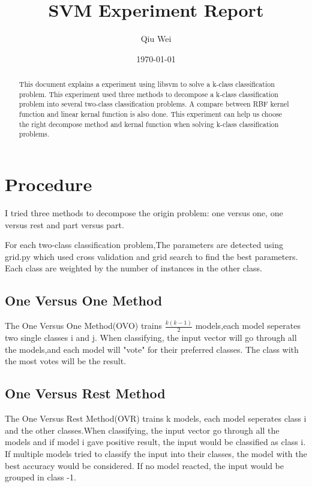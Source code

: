 \documentclass[11pt]{article}
\author{Qiu Wei}
\date{\today}
\title{SVM Experiment Report}
\begin{document}
\maketitle
\tableofcontents

\begin{abstract}
This document explains a experiment using libsvm to solve a
k-class classification problem. This experiment used three methods
to decompose a k-class classification problem into several two-class
classification problems. A compare between RBF kernel function and linear
kernal function is also done. This experiment can help us choose the
right decompose method and kernal function when solving k-class
classification problems.
\end{abstract}

\section{Procedure}
\label{sec-1}
I tried three methods to decompose the origin problem: one versus one,
one versus rest and part versus part.

For each two-class classification problem,The parameters are detected using
grid.py which used cross validation and grid search to find the best
parameters. Each class are weighted by the number of instances in the other class.

\subsection{One Versus One Method}
\label{sec-1-1}
The One Versus One Method(OVO) trains $ \frac{k(k-1)}{2} $
models,each model seperates two single classes i and j. When classifying,
the input vector will go through all the models,and each model
will "vote" for their preferred classes. The class with the
most votes will be the result.

\subsection{One Versus Rest Method}
\label{sec-1-2}
The One Versus Rest Method(OVR) trains k models, each model seperates class i and the other
classes.When classifying, the input vector go through all the models and if model i
gave positive result, the input would be classified as class i. If multiple models
tried to classify the input into their classes, the model with the best accuracy would be
considered. If no model reacted, the input would be grouped in class -1.
\end{document}
